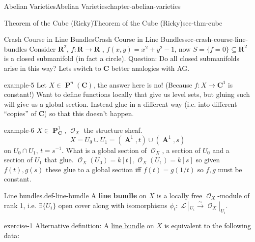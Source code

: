 \documentclass[oneside,10pt,]{book}
\newcommand{\terminology}[1]{\textbf{#1}}
\numberwithin{equation}{section}
\newcommand{\sheaf}[1]{\operatorname{\mathcal{#1}}}
\newcommand{\RR}{\mathbf{R}}
\newcommand{\CC}{\mathbf{C}}
\DeclareMathOperator{\aff}{\mathbf{A}}
\DeclareMathOperator{\PP}{\mathbf{P}}
\begin{document}
\begin{chapterptx}{Abelian Varieties}{}{Abelian Varieties}{}{}{chapter-abelian-varieties}
\typeout{************************************************}
%
\begin{sectionptx}{Theorem of the Cube (Ricky)}{}{Theorem of the Cube (Ricky)}{}{}{sec-thm-cube}
%
%
\typeout{************************************************}
\typeout{************************************************}
%
\begin{subsectionptx}{Crash Course in Line Bundles}{}{Crash Course in Line Bundles}{}{}{sec-crash-course-line-bundles}
\hypertarget{p-107}{}%
Consider \(\RR^2\), \(f\colon \RR \to \RR\) , \(f(x,y) = x^2 + y^2 -1\), now \(S = \{f=0\}\subseteq \RR^2\) is a closed submanifold (in fact a circle). Question: Do all closed submanifolds arise in this way? Lets switch to \(\CC\) better analogies with AG.%
\begin{example}{}{example-5}%
\hypertarget{p-108}{}%
Let \(X\in \PP^n(\CC)\), the answer here is no! (Because \(f\colon X \to \CC^1\) is constant!) Want to define functions locally that give us level sets, but gluing such will give us a global section. Instead glue in a different way (i.e. into different ``copies'' of \(\CC\)) so that this doesn't happen.%
\end{example}
\begin{example}{}{example-6}%
\hypertarget{p-109}{}%
\(X\in \PP_\CC^1\), \(\sheaf O_X\) the structure sheaf.%
\begin{equation*}
X = U_0 \cup U_1 = (\aff^1,t) \cup(\aff^1,s)
\end{equation*}
on \(U_0\cap U_1\), \(t = s^{-1}\). What is a global section of \(\sheaf O_X\), a section of \(U_0\) and a section of \(U_1\) that glue. \(\sheaf O_X(U_0) =  k[t], \sheaf O_X(U_1) =  k[s]\) so given \(f(t), g(s)\) these glue to a global section iff \(f(t) = g(1/t)\) so \(f,g\) must be constant.%
\end{example}
\begin{definition}{Line bundles.}{def-line-bundle}%
\hypertarget{p-110}{}%
A \terminology{line bundle} on \(X\) is a locally free \(\sheaf O_X\)-module of rank 1, i.e. \(\exists \{U_i\}\) open cover along with isomorphisms \(\phi_i\colon \sheaf L|_{U_i} \xrightarrow\sim \sheaf O_X |_{U_i}\).%
\end{definition}
\begin{inlineexercise}{}{exercise-1}%
\hypertarget{p-111}{}%
Alternative definition: A \hyperref[def-line-bundle]{line bundle} on \(X\) is equivalent to the following data:\leavevmode%
\begin{itemize}[label=\textbullet]

\end{itemize}
\end{inlineexercise}
\end{subsectionptx}
\end{sectionptx}
\end{chapterptx}
\end{document}
